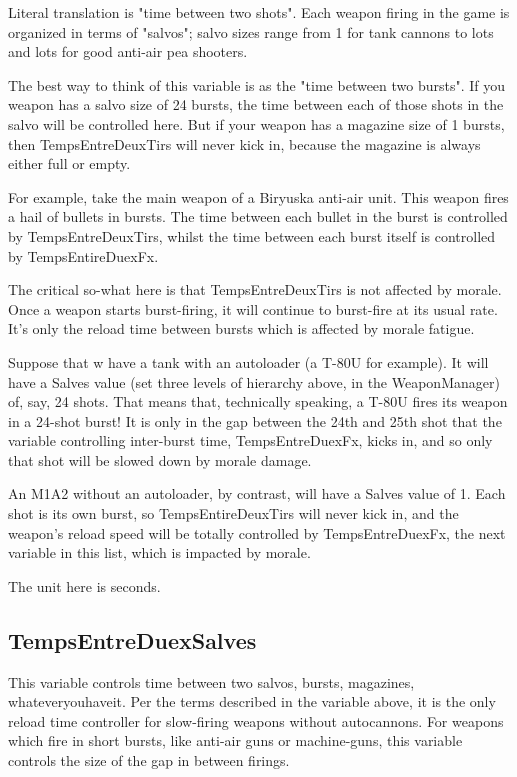 \documentclass{article}
\begin{document}
Literal translation is "time between two shots". Each weapon firing in the game is organized in terms of "salvos"; salvo sizes range from 1 for tank cannons to lots and lots for good anti-air pea shooters.

The best way to think of this variable is as the "time between two bursts". If you weapon has a salvo size of 24 bursts, the time between each of those shots in the salvo will be controlled here. But if your weapon has a magazine size of 1 bursts, then TempsEntreDeuxTirs will never kick in, because the magazine is always either full or empty.

For example, take the main weapon of a Biryuska anti-air unit. This weapon fires a hail of bullets in bursts. The time between each bullet in the burst is controlled by TempsEntreDeuxTirs, whilst the time between each burst itself is controlled by TempsEntireDuexFx.

The critical so-what here is that TempsEntreDeuxTirs is not affected by morale. Once a weapon starts burst-firing, it will continue to burst-fire at its usual rate. It's only the reload time between bursts which is affected by morale fatigue.

Suppose that w have a tank with an autoloader (a T-80U for example). It will have a Salves value (set three levels of hierarchy above, in the WeaponManager) of, say, 24 shots. That means that, technically speaking, a T-80U fires its weapon in a 24-shot burst! It is only in the gap between the 24th and 25th shot that the variable controlling inter-burst time, TempsEntreDuexFx, kicks in, and so only that shot will be slowed down by morale damage.

An M1A2 without an autoloader, by contrast, will have a Salves value of 1. Each shot is its own burst, so TempsEntireDeuxTirs will never kick in, and the weapon's reload speed will be totally controlled by TempsEntreDuexFx, the next variable in this list, which is impacted by morale.

The unit here is seconds.

\subsection{TempsEntreDuexSalves}

This variable controls time between two salvos, bursts, magazines, whateveryouhaveit. Per the terms described in the variable above, it is the only reload time controller for slow-firing weapons without autocannons. For weapons which fire in short bursts, like anti-air guns or machine-guns, this variable controls the size of the gap in between firings.
\end{document}
